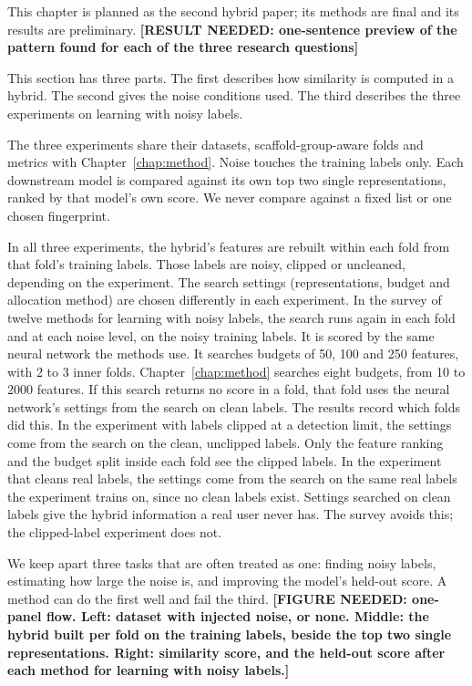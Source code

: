 This chapter is planned as the second hybrid paper; its methods are final and its results are preliminary. \textbf{[RESULT NEEDED: one-sentence preview of the pattern found for each of the three research questions]}

This section has three parts. The first describes how similarity is computed in a hybrid. The second gives the noise conditions used. The third describes the three experiments on learning with noisy labels.

The three experiments share their datasets, scaffold-group-aware folds and metrics with Chapter~\ref{chap:method}. Noise touches the training labels only. Each downstream model is compared against its own top two single representations, ranked by that model's own score. We never compare against a fixed list or one chosen fingerprint.

In all three experiments, the hybrid's features are rebuilt within each fold from that fold's training labels. Those labels are noisy, clipped or uncleaned, depending on the experiment. The search settings (representations, budget and allocation method) are chosen differently in each experiment. In the survey of twelve methods for learning with noisy labels, the search runs again in each fold and at each noise level, on the noisy training labels. It is scored by the same neural network the methods use. It searches budgets of 50, 100 and 250 features, with 2 to 3 inner folds. Chapter~\ref{chap:method} searches eight budgets, from 10 to 2000 features. If this search returns no score in a fold, that fold uses the neural network's settings from the search on clean labels. The results record which folds did this. In the experiment with labels clipped at a detection limit, the settings come from the search on the clean, unclipped labels. Only the feature ranking and the budget split inside each fold see the clipped labels. In the experiment that cleans real labels, the settings come from the search on the same real labels the experiment trains on, since no clean labels exist. Settings searched on clean labels give the hybrid information a real user never has. The survey avoids this; the clipped-label experiment does not.

We keep apart three tasks that are often treated as one: finding noisy labels, estimating how large the noise is, and improving the model's held-out score. A method can do the first well and fail the third. \textbf{[FIGURE NEEDED: one-panel flow. Left: dataset with injected noise, or none. Middle: the hybrid built per fold on the training labels, beside the top two single representations. Right: similarity score, and the held-out score after each method for learning with noisy labels.]}

